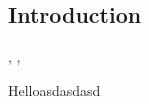 \setcounter{chapter}{-1}
\begin{singlespacing}
\chapter{Introduction}
\label{chapter:introduction}
%
\begin{epigraphs}
\qitem{%
\TODO{}}%
{\TODO{},
\textit{\TODO{}},
\TODO{}}
\end{epigraphs}
\end{singlespacing}

Helloasdasdasd
